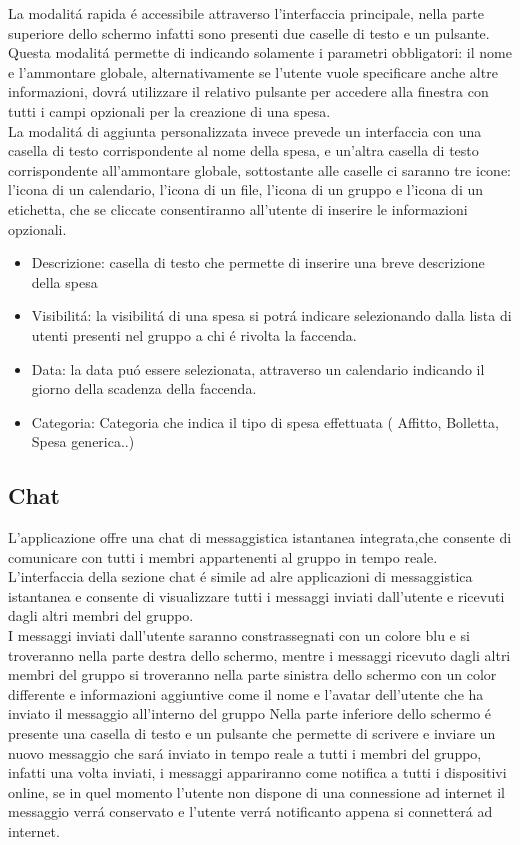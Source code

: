 La modalit\'a rapida \'e accessibile attraverso l'interfaccia principale, nella parte superiore dello schermo infatti sono presenti due caselle di testo e un pulsante.
Questa modalit\'a permette di indicando solamente i parametri obbligatori: il nome e l'ammontare globale, alternativamente se l'utente vuole specificare anche altre informazioni, dovr\'a utilizzare  il relativo pulsante per accedere alla finestra con tutti i campi opzionali per la creazione di una spesa.\\
La modalit\'a di aggiunta personalizzata invece prevede un interfaccia con una casella di testo corrispondente al nome della spesa, e un'altra casella di testo corrispondente all'ammontare globale, sottostante alle caselle ci saranno tre icone: l'icona di un calendario, l'icona di un file, l'icona di un gruppo e l'icona di un etichetta, che se cliccate consentiranno all'utente di inserire le informazioni opzionali.

\begin{itemize}
   \item Descrizione: casella di testo che permette di inserire una breve descrizione della spesa
   \item Visibilit\'a: la visibilit\'a di una spesa si potr\'a indicare selezionando dalla lista di utenti presenti nel gruppo a chi \'e rivolta la faccenda.
   \item Data: la data pu\'o essere selezionata, attraverso un calendario indicando il giorno della scadenza della faccenda.
    \item Categoria: Categoria che indica il tipo di spesa effettuata ( Affitto, Bolletta, Spesa generica..)
\end{itemize}




\subsection{Chat}
L'applicazione offre una chat di messaggistica istantanea integrata,che consente di comunicare con tutti i membri appartenenti al gruppo in tempo reale.\\
L'interfaccia della sezione chat \'e simile ad alre applicazioni di messaggistica istantanea e consente di visualizzare tutti i messaggi inviati dall'utente e ricevuti dagli altri membri del gruppo.\\
I messaggi inviati dall'utente saranno constrassegnati con un colore blu e si troveranno nella parte destra dello schermo, mentre i messaggi ricevuto dagli altri membri del gruppo si troveranno nella parte sinistra dello schermo con un color differente e informazioni aggiuntive come il nome e l'avatar dell'utente che ha inviato il messaggio all'interno del gruppo
Nella parte inferiore dello schermo \'e presente una casella di testo e un pulsante che permette di scrivere e inviare un nuovo messaggio che sar\'a inviato in tempo reale a tutti i membri del gruppo, infatti una volta inviati, i messaggi appariranno come notifica a tutti i dispositivi online, se in quel momento l'utente non dispone di una connessione ad internet il messaggio verr\'a conservato e l'utente verr\'a notificanto appena si connetter\'a ad internet.


